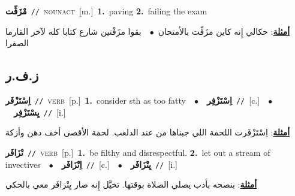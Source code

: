 \documentclass[10pt,a4paper,twoside]{article} %
\begin{document}
\begin{multicols}{2}
{\setlength\topsep{0pt}\textbf{\foreignlanguage{arabic}{مْزَفِّت}}\ {\color{gray}\texttt{//}\color{black}}\ \textsc{noun\textunderscore act}\ [m.]\ \textbf{1.}~paving  \textbf{2.}~failing the exam\  \begin{flushright}\color{gray}\foreignlanguage{arabic}{\textbf{\underline{\foreignlanguage{arabic}{أمثلة}}}: حكالي إِنه كاين مزَفِّت بالأمتحان\ $\bullet$\ \  بقوا مزَفْتين شارع كتابا كله لآخر القارما الصفرا}\end{flushright}\color{black}} \vspace{2mm}

\vspace{-3mm}
\subsection*{\color{blue}\foreignlanguage{arabic}{ز.ف.ر}\color{blue}{}} 

{\setlength\topsep{0pt}\textbf{\foreignlanguage{arabic}{اِسْتَزْفَر}}\ {\color{gray}\texttt{//}\color{black}}\ \textsc{verb}\ [p.]\ \textbf{1.}~consider sth as too fatty\ \ $\bullet$\ \ \setlength\topsep{0pt}\textbf{\foreignlanguage{arabic}{اِسْتَزْفِر}}\ {\color{gray}\texttt{//}\color{black}}\ [c.]\ \ $\bullet$\ \ \setlength\topsep{0pt}\textbf{\foreignlanguage{arabic}{يِسْتَزْفِر}}\ {\color{gray}\texttt{//}\color{black}}\ [i.]\  \begin{flushright}\color{gray}\foreignlanguage{arabic}{\textbf{\underline{\foreignlanguage{arabic}{أمثلة}}}: اِسْتَزْفَرت اللحمة اللي جبناها من عند الدلعب. لحمة الأقصى أخف دهن وأزكة}\end{flushright}\color{black}} \vspace{2mm}

{\setlength\topsep{0pt}\textbf{\foreignlanguage{arabic}{تْزَافَر}}\ {\color{gray}\texttt{//}\color{black}}\ \textsc{verb}\ [p.]\ \textbf{1.}~be filthy and disrespectful.  \textbf{2.}~let out a stream of invectives\ \ $\bullet$\ \ \setlength\topsep{0pt}\textbf{\foreignlanguage{arabic}{اِتْزَافَر}}\ {\color{gray}\texttt{//}\color{black}}\ [c.]\ \ $\bullet$\ \ \setlength\topsep{0pt}\textbf{\foreignlanguage{arabic}{يِتْزَافَر}}\ {\color{gray}\texttt{//}\color{black}}\ [i.]\  \begin{flushright}\color{gray}\foreignlanguage{arabic}{\textbf{\underline{\foreignlanguage{arabic}{أمثلة}}}: بنصحه بأدب يصلي الصلاة بوقتها. تخيَّل إِنه صار يِتْزافَر معي بالحكي}\end{flushright}\color{black}} \vspace{2mm}


\end{multicols}
\end{document}
